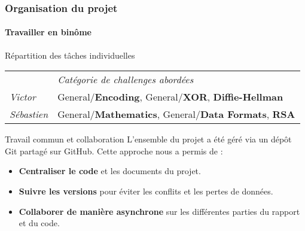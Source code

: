\begin{frame}
    \frametitle{Organisation du projet}
    \framesubtitle{Travailler en binôme}

    \begin{block}{Répartition des tâches individuelles}
        \centering
        \small
        \begin{tabular}{ll} 
            \textbf{} & \textit{Catégorie de challenges abordées} \\
            \textit{Victor} & General/\textbf{Encoding}, General/\textbf{XOR}, \textbf{Diffie-Hellman} \\
            \textit{Sébastien} & General/\textbf{Mathematics}, General/\textbf{Data Formats}, \textbf{RSA} \\
        \end{tabular}
    \end{block}

    \vspace{0.5cm} %

    \begin{alertblock}{Travail commun et collaboration}
        L'ensemble du projet a été géré via un dépôt Git partagé sur GitHub. Cette approche nous a permis de :
        \begin{itemize}
            \item \textbf{Centraliser le code} et les documents du projet.
            \item \textbf{Suivre les versions} pour éviter les conflits et les pertes de données.
            \item \textbf{Collaborer de manière asynchrone} sur les différentes parties du rapport et du code.
        \end{itemize}
    \end{alertblock}

\end{frame}